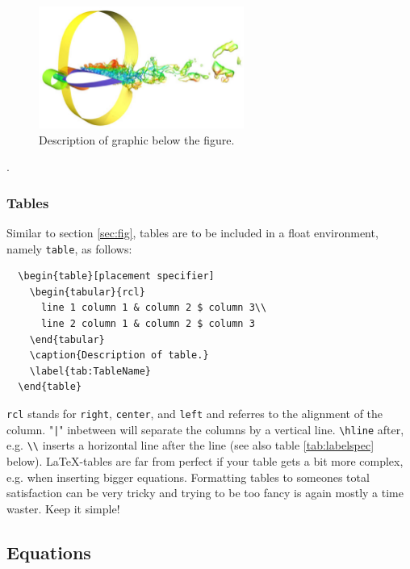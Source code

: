 \documentclass[../main.tex]{subfiles}
\begin{document}
\begin{figure}[h]
  \centering
  \includegraphics[width=0.6\textwidth]{./fig/example.eps}
  \caption[Referenced name in the figure list]{Description of graphic below the figure.}
  \label{fig:GraphicLabel}
\end{figure}.

\subsubsection{Tables}
\label{sec:tab}

Similar to section \ref{sec:fig}, tables are to be included in a float
environment, namely \verb!table!, as follows:

\begin{verbatim}
  \begin{table}[placement specifier]
    \begin{tabular}{rcl}
      line 1 column 1 & column 2 $ column 3\\
      line 2 column 1 & column 2 $ column 3
    \end{tabular}
    \caption{Description of table.}
    \label{tab:TableName}
  \end{table}
\end{verbatim}

\verb!rcl! stands for \verb!right!, \verb!center!, and \verb!left! and
referres to the alignment of the column. "\verb!|!" inbetween will separate
the columns by a vertical line. \verb!\hline! after, e.g. \verb!\\! inserts a
horizontal line after the line (see also table \ref{tab:labelspec}
below). \LaTeX-tables are far from perfect if your table gets a bit more
complex, e.g. when inserting bigger equations. Formatting tables to someones
total satisfaction can be very tricky and trying to be too fancy is again
mostly a time waster. Keep it simple!

\subsection{Equations}
\label{sec:eq}
\end{document}
